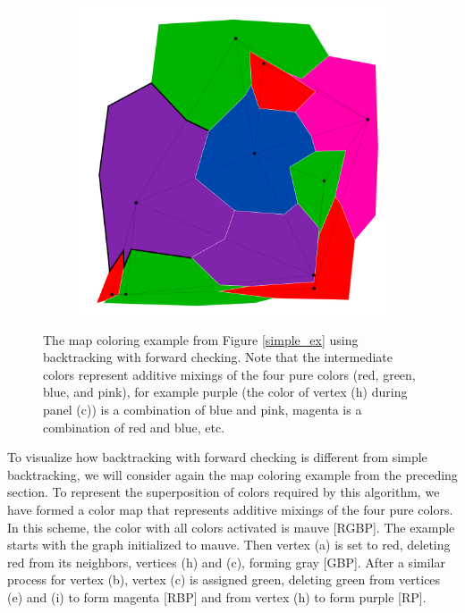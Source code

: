 \documentclass{article}
\begin{document}
\begin{figure}[h!]
\begin{subfigure}{0.18\textwidth}
				\caption{}
				\label{high_f4}
			\end{subfigure}
			\;
			\begin{subfigure}{0.18\textwidth}
				\centering
				\includegraphics[width=\textwidth]{images/sequences/forward_backtracking/bt_forward_I00021}
				\caption{}
				\label{high_f5}
			\end{subfigure}
	
			\caption{The map coloring example from Figure \ref{simple_ex} using backtracking with forward checking. Note that the intermediate colors represent additive mixings of the four pure colors (red, green, blue, and pink), for example purple (the color of vertex (h) during panel (c)) is a combination of blue and pink, magenta is a combination of red and blue, etc.}
			
			\label{forward_example}
		\end{figure}
		
		To visualize how backtracking with forward checking is different from simple backtracking, we will consider again the map coloring example from the preceding section. To represent the superposition of colors required by this algorithm, we have formed a color map that represents additive mixings of the four pure colors. In this scheme, the color with all colors activated is mauve [RGBP]. The example starts with the graph initialized to mauve. Then vertex (a) is set to red, deleting red from its neighbors, vertices (h) and (c), forming gray [GBP]. After a similar process for vertex (b), vertex (c) is assigned green, deleting green from vertices (e) and (i) to form magenta [RBP] and from vertex (h) to form purple [RP].
		
\end{document}
